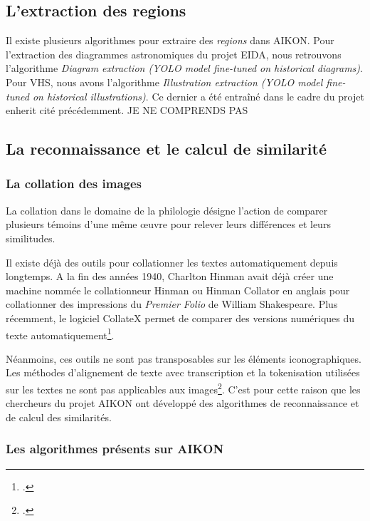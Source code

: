 \subsection{L'extraction des regions}

Il existe plusieurs algorithmes pour extraire des \textit{regions} dans AIKON. 
Pour l'extraction des diagrammes astronomiques du projet EIDA, nous retrouvons l'algorithme \textit{Diagram extraction (YOLO model fine-tuned on historical diagrams)}.
Pour VHS, nous avons l'algorithme \textit{Illustration extraction (YOLO model fine-tuned on historical illustrations)}. Ce dernier a été entraîné dans le cadre du projet \gls{enherit} cité précédemment. JE NE COMPRENDS PAS

\subsection{La reconnaissance et le calcul de similarité}

\subsubsection{La collation des images}

La collation dans le domaine de la philologie désigne l'action de comparer plusieurs témoins d'une même œuvre pour relever leurs différences et leurs similitudes. 

Il existe déjà des outils pour collationner les textes automatiquement depuis longtemps. A la fin des années 1940, Charlton Hinman avait déjà créer une machine nommée le collationneur Hinman ou Hinman Collator en anglais pour collationner des impressions du \textit{Premier Folio} de William Shakespeare. Plus récemment, le logiciel CollateX permet de comparer des versions numériques du texte automatiquement\footcite{kaouaImageCollationMatching2021}. 

Néanmoins, ces outils ne sont pas transposables sur les éléments iconographiques. Les méthodes d'alignement de texte avec transcription et la tokenisation utilisées sur les textes ne sont pas applicables aux images\footcite{kaouaImageCollationMatching2021}. C'est pour cette raison que les chercheurs du projet AIKON ont développé des algorithmes de reconnaissance et de calcul des similarités. 


\subsubsection{Les algorithmes présents sur AIKON}

